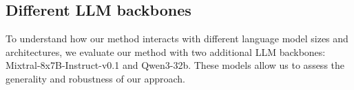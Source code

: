 

\subsection{Different LLM backbones}
To understand how our method interacts with different language model sizes and architectures, we evaluate our method with two additional LLM backbones: Mixtral-8x7B-Instruct-v0.1 and Qwen3-32b. These models allow us to assess the generality and robustness of our approach. 

